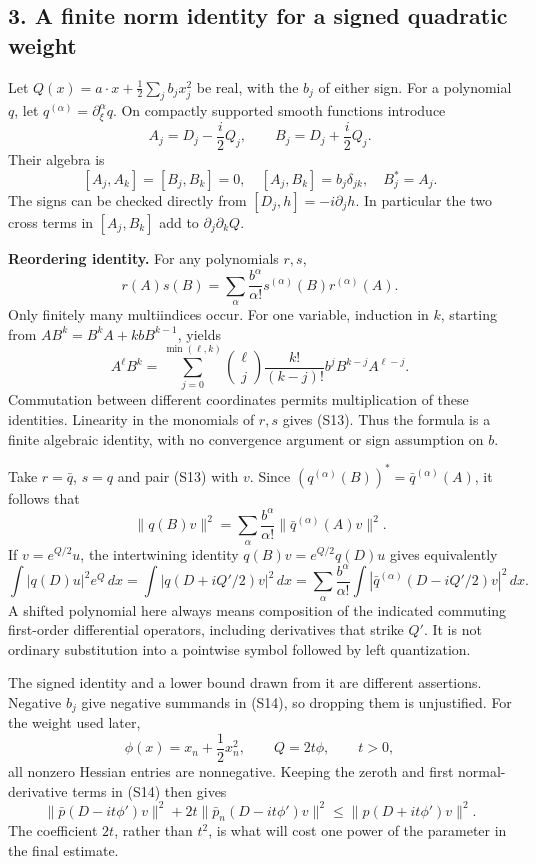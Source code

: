 \documentclass[
  11pt,
]{article}
\begin{document}
\subsection{3. A finite norm identity for a signed quadratic
weight}\label{a-finite-norm-identity-for-a-signed-quadratic-weight}

Let \(Q(x)=a\cdot x+\frac12\sum_jb_jx_j^2\) be real, with the \(b_j\) of
either sign. For a polynomial \(q\), let
\(q^{(\alpha)}=\partial_\xi^\alpha q\). On compactly supported smooth
functions introduce \[
 A_j=D_j-\frac i2Q_j,\qquad B_j=D_j+\frac i2Q_j.                   \tag{S11}
\] Their algebra is \[
 [A_j,A_k]=[B_j,B_k]=0,\quad [A_j,B_k]=b_j\delta_{jk},\quad
 B_j^*=A_j.                                                       \tag{S12}
\] The signs can be checked directly from \([D_j,h]=-i\partial_jh\). In
particular the two cross terms in \([A_j,B_k]\) add to
\(\partial_j\partial_k Q\).

\textbf{Reordering identity.} For any polynomials \(r,s\), \[
 r(A)s(B)=\sum_\alpha\frac{b^\alpha}{\alpha!}
                   s^{(\alpha)}(B)r^{(\alpha)}(A).               \tag{S13}
\] Only finitely many multiindices occur. For one variable, induction in
\(k\), starting from \(AB^k=B^kA+kbB^{k-1}\), yields \[
 A^\ell B^k=
 \sum_{j=0}^{\min(\ell,k)}
  \binom{\ell}{j}\frac{k!}{(k-j)!}b^j B^{k-j}A^{\ell-j}.
\] Commutation between different coordinates permits multiplication of
these identities. Linearity in the monomials of \(r,s\) gives (S13).
Thus the formula is a finite algebraic identity, with no convergence
argument or sign assumption on \(b\).

Take \(r=\bar q\), \(s=q\) and pair (S13) with \(v\). Since
\((q^{(\alpha)}(B))^*=\bar q^{(\alpha)}(A)\), it follows that \[
 \|q(B)v\|^2=
       \sum_\alpha\frac{b^\alpha}{\alpha!}
                       \|\bar q^{(\alpha)}(A)v\|^2.              \tag{S14}
\] If \(v=e^{Q/2}u\), the intertwining identity \(q(B)v=e^{Q/2}q(D)u\)
gives equivalently \[
 \int|q(D)u|^2e^Q\,dx
 =\int|q(D+iQ'/2)v|^2\,dx
 =\sum_\alpha\frac{b^\alpha}{\alpha!}
                  \int|\bar q^{(\alpha)}(D-iQ'/2)v|^2\,dx.       \tag{S15}
\] A shifted polynomial here always means composition of the indicated
commuting first-order differential operators, including derivatives that
strike \(Q'\). It is not ordinary substitution into a pointwise symbol
followed by left quantization.

The signed identity and a lower bound drawn from it are different
assertions. Negative \(b_j\) give negative summands in (S14), so
dropping them is unjustified. For the weight used later, \[
 \phi(x)=x_n+\frac12x_n^2,\qquad Q=2t\phi,\qquad t>0,              \tag{S16}
\] all nonzero Hessian entries are nonnegative. Keeping the zeroth and
first normal-derivative terms in (S14) then gives \[
 \|\bar p(D-it\phi')v\|^2+
  2t\|\bar p_n(D-it\phi')v\|^2
 \leq\|p(D+it\phi')v\|^2.                                       \tag{S17}
\] The coefficient \(2t\), rather than \(t^2\), is what will cost one
power of the parameter in the final estimate.
\end{document}
